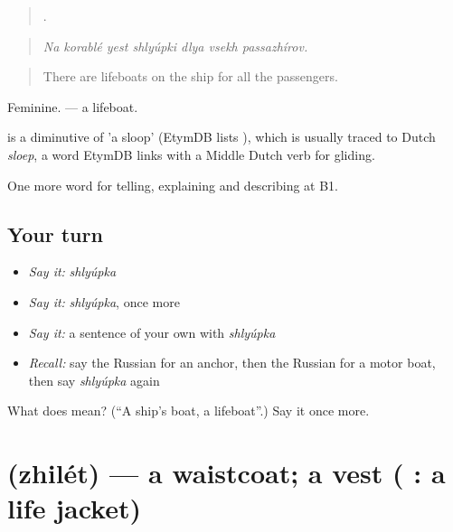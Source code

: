 \begin{quote}
      .
\end{quote}

\begin{quote}
\emph{Na korablé yest shlyúpki dlya vsekh passazhírov.}
\end{quote}

\begin{quote}
There are lifeboats on the ship for all the passengers.
\end{quote}

Feminine. \emph{ } — a lifeboat.

\begin{cousinweb}
\emph{} is a diminutive of \emph{} 'a sloop' (EtymDB lists \emph{}), which is usually traced to Dutch \emph{sloep}, a word EtymDB links with a Middle Dutch verb for gliding.
\end{cousinweb}

\begin{grammarlens}[title={What you've built}]
One more word for telling, explaining and describing at B1.
\end{grammarlens}

\subsection*{Your turn}
\begin{itemize}
\raggedright
  \item \emph{Say it:} \emph{shlyúpka}
  \item \emph{Say it:} \emph{shlyúpka}, once more
  \item \emph{Say it:} a sentence of your own with \emph{shlyúpka}
  \item \emph{Recall:} say the Russian for an anchor, then the Russian for a motor boat, then say \emph{shlyúpka} again
\end{itemize}

\begin{tcolorbox}[breakable,colback=teal!4,colframe=teal!35!black,title={Before you move on}]
What does  mean? (\textquotedblleft{}A ship's boat, a lifeboat\textquotedblright{}.) Say it once more.
\end{tcolorbox}
\section[\texorpdfstring{\ru{жилет} (zhilét)}{жилет (zhilét)}]{ (zhilét) — a waistcoat; a vest ( : a life jacket)}

